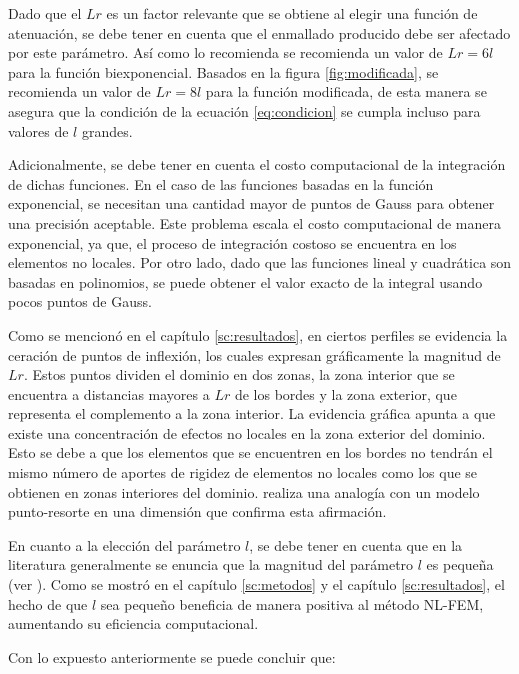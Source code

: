 Dado que el $Lr$ es un factor relevante que se obtiene al elegir una función de atenuación, se debe tener en cuenta que el enmallado producido debe ser afectado por este parámetro. Así como lo recomienda \textcite{Polizzotto2001} se recomienda un valor de $Lr=6l$ para la función biexponencial. Basados en la figura \ref{fig:modificada}, se recomienda un valor de $Lr=8l$ para la función modificada, de esta manera se asegura que la condición de la ecuación \ref{eq:condicion} se cumpla incluso para valores de $l$ grandes.

Adicionalmente, se debe tener en cuenta el costo computacional de la integración de dichas funciones. En el caso de las funciones basadas en la función exponencial, se necesitan una cantidad mayor de puntos de Gauss para obtener una precisión aceptable. Este problema escala el costo computacional de manera exponencial, ya que, el proceso de integración costoso se encuentra en los elementos no locales.
Por otro lado, dado que las funciones lineal y cuadrática son basadas en polinomios, se puede obtener el valor exacto de la integral usando pocos puntos de Gauss.

Como se mencionó en el capítulo \ref{sc:resultados}, en ciertos perfiles se evidencia la ceración de puntos de inflexión, los cuales expresan gráficamente la magnitud de $Lr$. Estos puntos dividen el dominio en dos zonas, la zona interior que se encuentra a distancias mayores a $Lr$ de los bordes y la zona exterior, que representa el complemento a la zona interior. La evidencia gráfica apunta a que existe una concentración de efectos no locales en la zona exterior del dominio. Esto se debe a que los elementos que se encuentren en los bordes no tendrán el mismo número de aportes de rigidez de elementos no locales como los que se obtienen en zonas interiores del dominio. \textcite{DiPaola2009} realiza una analogía con un modelo punto-resorte en una dimensión que confirma esta afirmación.

En cuanto a la elección del parámetro $l$, se debe tener en cuenta que en la literatura generalmente se enuncia que la magnitud del parámetro $l$ es pequeña (ver \cite{Eringen1972,Eringen1987}). Como se mostró en el capítulo \ref{sc:metodos} y el capítulo \ref{sc:resultados}, el hecho de que $l$ sea pequeño beneficia de manera positiva al método NL-FEM, aumentando su eficiencia computacional.

Con lo expuesto anteriormente se puede concluir que:


